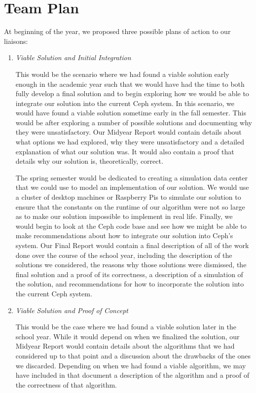 \chapter{Team Plan}
\label{sec:plan}

At beginning of the year, we proposed three possible plans of action
to our liaisons:

\begin{enumerate}

\item \emph{Viable Solution and Initial Integration}

  This would be the scenario where we had found a viable solution
  early enough in the academic year such that we would have had the
  time to both fully develop a final solution and to begin exploring
  how we would be able to integrate our solution into the current Ceph
  system. In this scenario, we would have found a viable solution
  sometime early in the fall semester. This would be after exploring a
  number of possible solutions and documenting why they were
  unsatisfactory. Our Midyear Report would contain details about what
  options we had explored, why they were unsatisfactory and a detailed
  explanation of what our solution was. It would also contain a proof
  that details why our solution is, theoretically, correct.

  The spring semester would be dedicated to creating a simulation data
  center that we could use to model an implementation of our
  solution. We would use a cluster of desktop machines or Raspberry
  Pis to simulate our solution to ensure that the constants on the
  runtime of our algorithm were not so large as to make our solution
  impossible to implement in real life. Finally, we would begin to
  look at the Ceph code base and see how we might be able to make
  recommendations about how to integrate our solution into Ceph's
  system. Our Final Report would contain a final description of all of
  the work done over the course of the school year, including the
  description of the solutions we considered, the reasons why those
  solutions were dismissed, the final solution and a proof of its
  correctness, a description of a simulation of the solution, and
  recommendations for how to incorporate the solution into the current
  Ceph system.


\item \emph{Viable Solution and Proof of Concept}

  This would be the case where we had found a viable solution later in
  the school year. While it would depend on when we finalized the
  solution, our Midyear Report would contain details about the
  algorithms that we had considered up to that point and a discussion
  about the drawbacks of the ones we discarded. Depending on when we
  had found a viable algorithm, we may have included in that document
  a description of the algorithm and a proof of the correctness of that
  algorithm.


\end{enumerate}
